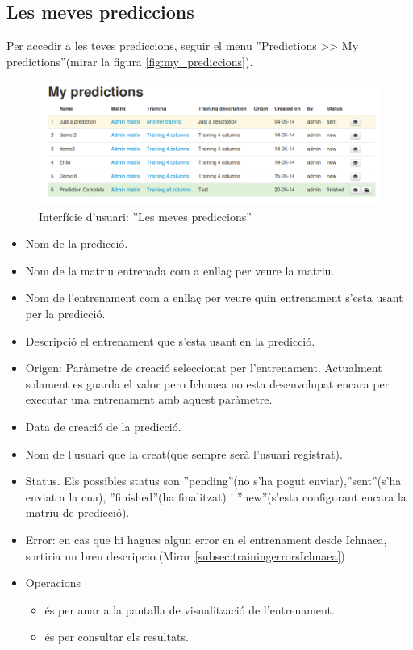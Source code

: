 \subsection{Les meves prediccions}
\label{subsec:myPrediccions}
Per accedir a les teves prediccions, seguir el menu ''Predictions >> My predictions''(mirar la figura \ref{fig:my_prediccions}).
\begin{figure}[h!]
  \centering
  \includegraphics[scale=0.4]{img/userguide/my_predictions.png}
  \caption{Interfície d'usuari: ''Les meves prediccions''}
  \label{fig:my_predictions}
\end{figure}
\begin{itemize}
\item Nom de la predicció.
\item Nom de la matriu entrenada com a enllaç per veure la matriu.
\item Nom de l'entrenament com a enllaç per veure quin entrenament s'esta usant per la predicció.
\item Descripció el entrenament que s'esta usant en la predicció.
\item Origen: Paràmetre de creació seleccionat per l'entrenament. Actualment solament es guarda el valor pero Ichnaea no esta desenvolupat encara per executar una entrenament amb aquest paràmetre.
\item Data de creaci\'{o} de la predicció.
\item Nom de l'usuari que la creat(que sempre serà l'usuari registrat).
\item Status. Els possibles status son ''pending''(no s'ha pogut enviar),''sent''(s'ha enviat a la cua), ''finished''(ha finalitzat) i ''new''(s'esta configurant encara la matriu de predicció).
\item Error: en cas que hi hagues algun error en el entrenament desde Ichnaea, sortiria un breu descripcio.(Mirar \ref{subsec:trainingerrorsIchnaea})
\item Operacions
 \begin{itemize}
 \item \iconeyeopen \'{e}s per anar a la pantalla de visualització de l'entrenament.
 \item \iconresults \'{e}s per consultar els resultats.
 \end{itemize}
\end{itemize}

